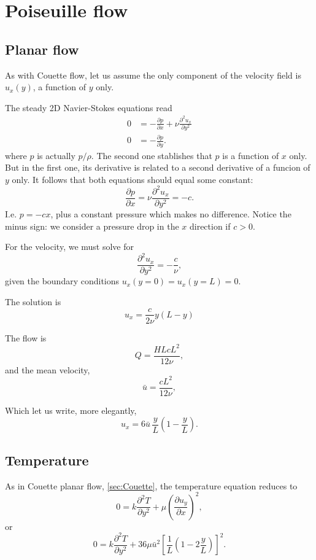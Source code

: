 \section{Poiseuille flow}

\subsection{Planar flow}

As with Couette flow, let us assume the only component
of the velocity field is $u_x(y)$, a function of $y$ only.

The steady 2D Navier-Stokes equations read
\begin{align}
  0 & =   - \frac{\partial p}{\partial x} +
  \nu
  \frac{\partial^2 u_x}{\partial y^2}
   \\
  0 &=   - \frac{\partial p}{\partial y} .
\end{align}
where $p$ is actually $p/\rho$. The second one stablishes that $p$ is
a function of $x$ only. But in the first one, its derivative is
related to a second derivative of a funcion of $y$ only. It follows
that both equations should equal some constant:
\[
\frac{\partial p}{\partial x} =
 \nu
  \frac{\partial^2 u_x}{\partial y^2} = -c .
\]
I.e. $p= - c x$, plus a constant pressure which makes no
difference. Notice the minus sign: we consider a pressure drop in
the $x$ direction if $c > 0$.

For the velocity, we must solve for
\[
  \frac{\partial^2 u_x}{\partial y^2} = -\frac{c}{\nu} ,
\]
given the boundary conditions $u_x(y=0)=u_x(y=L)=0$.

The solution is
\begin{equation}
  \label{eq:Poiseuille_u}
  u_x=\frac{c}{2\nu} y (L-y)  
\end{equation}

The flow is
\[
Q= \frac{HL c L^2}{12\nu} ,
\]
and the mean velocity,
\[
\bar{u}= \frac{c L^2}{12\nu} ,
\]

Which let us write, more elegantly,
\[
u_x=6 \bar{u} \,  \frac{y}{L} \left( 1- \frac{y}{L}\right). 
\]


\subsection{Temperature}

As in Couette planar flow, \ref{sec:Couette}, the temperature equation
reduces to
\[
0 =  k \frac{\partial^2 T}{\partial y^2} +
\mu  \left( \frac{\partial u_y}{\partial x} \right)^2,
\]
or
\[
0 =  k \frac{\partial^2 T}{\partial y^2} +
36 \mu \bar{u}^2 \left[
  \frac{1}{L} \left( 1- 2 \frac{y}{L}  \right)
  \right]^2 .
\]

